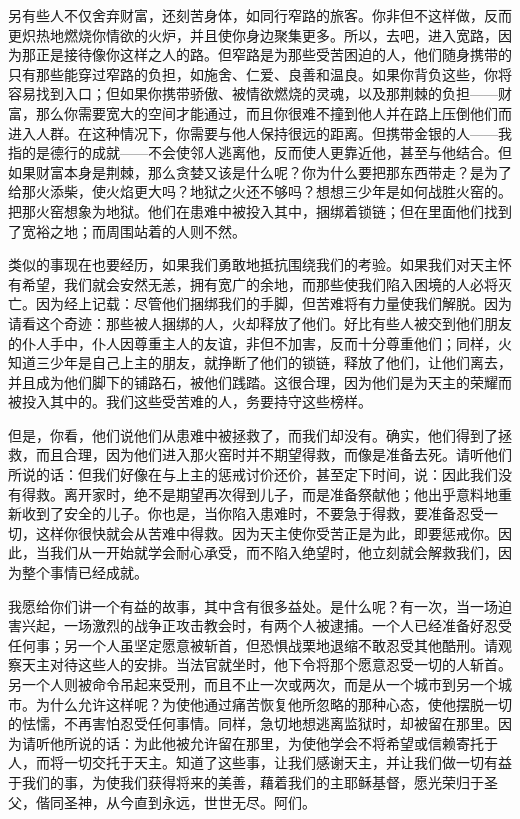 另有些人不仅舍弃财富，还刻苦身体，如同行窄路的旅客。你非但不这样做，反而更炽热地燃烧你情欲的火炉，并且使你身边聚集更多。所以，去吧，进入宽路，因为那正是接待像你这样之人的路。但窄路是为那些受苦困迫的人，他们随身携带的只有那些能穿过窄路的负担，如施舍、仁爱、良善和温良。如果你背负这些，你将容易找到入口；但如果你携带骄傲、被情欲燃烧的灵魂，以及那荆棘的负担——财富，那么你需要宽大的空间才能通过，而且你很难不撞到他人并在路上压倒他们而进入人群。在这种情况下，你需要与他人保持很远的距离。但携带金银的人——我指的是德行的成就——不会使邻人逃离他，反而使人更靠近他，甚至与他结合。但如果财富本身是荆棘，那么贪婪又该是什么呢？你为什么要把那东西带走？是为了给那火添柴，使火焰更大吗？地狱之火还不够吗？想想三少年是如何战胜火窑的。把那火窑想象为地狱。他们在患难中被投入其中，捆绑着锁链；但在里面他们找到了宽裕之地；而周围站着的人则不然。\par

类似的事现在也要经历，如果我们勇敢地抵抗围绕我们的考验。如果我们对天主怀有希望，我们就会安然无恙，拥有宽广的余地，而那些使我们陷入困境的人必将灭亡。因为经上记载：尽管他们捆绑我们的手脚，但苦难将有力量使我们解脱。因为请看这个奇迹：那些被人捆绑的人，火却释放了他们。好比有些人被交到他们朋友的仆人手中，仆人因尊重主人的友谊，非但不加害，反而十分尊重他们；同样，火知道三少年是自己上主的朋友，就挣断了他们的锁链，释放了他们，让他们离去，并且成为他们脚下的铺路石，被他们践踏。这很合理，因为他们是为天主的荣耀而被投入其中的。我们这些受苦难的人，务要持守这些榜样。\par

但是，你看，他们说他们从患难中被拯救了，而我们却没有。确实，他们得到了拯救，而且合理，因为他们进入那火窑时并不期望得救，而像是准备去死。请听他们所说的话：但我们好像在与上主的惩戒讨价还价，甚至定下时间，说：因此我们没有得救。离开家时，绝不是期望再次得到儿子，而是准备祭献他；他出乎意料地重新收到了安全的儿子。你也是，当你陷入患难时，不要急于得救，要准备忍受一切，这样你很快就会从苦难中得救。因为天主使你受苦正是为此，即要惩戒你。因此，当我们从一开始就学会耐心承受，而不陷入绝望时，他立刻就会解救我们，因为整个事情已经成就。\par

我愿给你们讲一个有益的故事，其中含有很多益处。是什么呢？有一次，当一场迫害兴起，一场激烈的战争正攻击教会时，有两个人被逮捕。一个人已经准备好忍受任何事；另一个人虽坚定愿意被斩首，但恐惧战栗地退缩不敢忍受其他酷刑。请观察天主对待这些人的安排。当法官就坐时，他下令将那个愿意忍受一切的人斩首。另一个人则被命令吊起来受刑，而且不止一次或两次，而是从一个城市到另一个城市。为什么允许这样呢？为使他通过痛苦恢复他所忽略的那种心态，使他摆脱一切的怯懦，不再害怕忍受任何事情。同样，急切地想逃离监狱时，却被留在那里。因为请听他所说的话：为此他被允许留在那里，为使他学会不将希望或信赖寄托于人，而将一切交托于天主。知道了这些事，让我们感谢天主，并让我们做一切有益于我们的事，为使我们获得将来的美善，藉着我们的主耶稣基督，愿光荣归于圣父，偕同圣神，从今直到永远，世世无尽。阿们。\par

